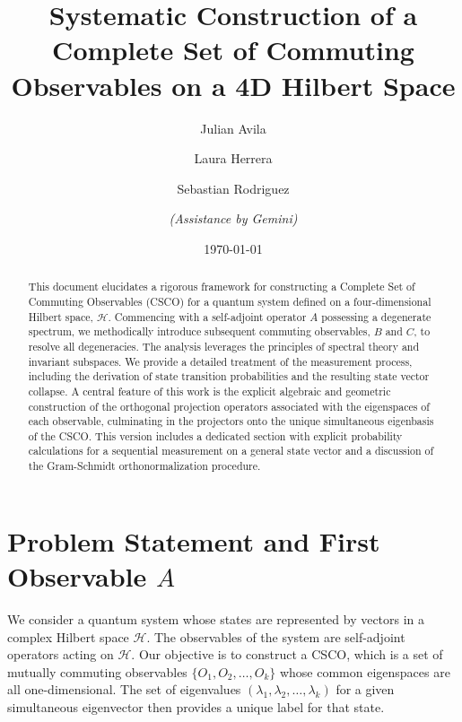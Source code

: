 \documentclass[11pt,a4paper]{article}
\title{Systematic Construction of a Complete Set of Commuting Observables on a
4D Hilbert Space}
\author{Julian Avila \and Laura Herrera \and Sebastian Rodriguez \\ \and
\textit{(Assistance by Gemini)}}
\date{\today}
\begin{document}
\maketitle

\begin{abstract}
  This document elucidates a rigorous framework for constructing a Complete Set of
  Commuting Observables (CSCO) for a quantum system defined on a four-dimensional
  Hilbert space, $\mathcal{H}$. Commencing with a self-adjoint operator $A$
  possessing a degenerate spectrum, we methodically introduce subsequent commuting
  observables, $B$ and $C$, to resolve all degeneracies. The analysis leverages
  the principles of spectral theory and invariant subspaces. We provide a detailed
  treatment of the measurement process, including the derivation of state
  transition probabilities and the resulting state vector collapse. A central
  feature of this work is the explicit algebraic and geometric construction of the
  orthogonal projection operators associated with the eigenspaces of each
  observable, culminating in the projectors onto the unique simultaneous
  eigenbasis of the CSCO. This version includes a dedicated section with explicit
  probability calculations for a sequential measurement on a general state vector
  and a discussion of the Gram-Schmidt orthonormalization procedure.
\end{abstract}

\section{Problem Statement and First Observable \texorpdfstring{$A$}{A}}

We consider a quantum system whose states are represented by vectors in a
complex Hilbert space $\mathcal{H}$. The observables of the system are
self-adjoint operators acting on $\mathcal{H}$. Our objective is to construct a
CSCO, which is a set of mutually commuting observables $\{O_1, O_2, \dots,
O_k\}$ whose common eigenspaces are all one-dimensional. The set of eigenvalues
$(\lambda_1, \lambda_2, \dots, \lambda_k)$ for a given simultaneous eigenvector
then provides a unique label for that state.
\end{document}

